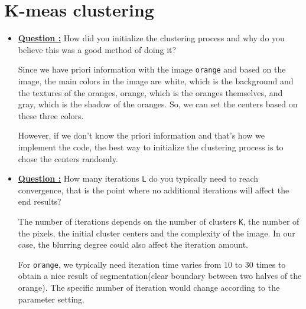 \documentclass[11pt,a4paper]{article}
\begin{document}
\section{K-meas clustering}
\begin{itemize}
	\item\addtocounter{Counter}{1}\underline{\textbf{Question :}} How did you initialize the clustering process and why do you believe this was a good method of doing it?
		\par Since we have priori information with the image \texttt{orange} and based on the image, the main colors in the image are white, which is the background and the textures of the oranges, orange, which is the oranges themselves, and gray, which is the shadow of the oranges. So, we can set the centers based on these three colors.
		\par However, if we don't know the priori information and that's how we implement the code, the best way to initialize the clustering process is to chose the centers randomly.

	\item\addtocounter{Counter}{1}\underline{\textbf{Question :}} How many iterations \texttt{L} do you typically need to reach convergence, that is the point where no additional iterations will affect the end results?
		\par The number of iterations depends on the number of clusters \texttt{K}, the number of the pixels, the initial cluster centers and the complexity of the image. In our case, the blurring degree could also affect the iteration amount.
		\par For \texttt{orange}, we typically need iteration time varies from $10$ to $30$ times to obtain a nice result of segmentation(clear boundary between two halves of the orange). The specific number of iteration would change according to the parameter setting.


\end{itemize}
\end{document}
